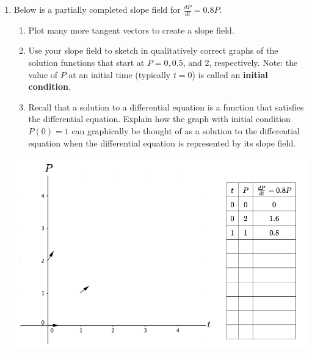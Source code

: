 \begin{enumerate}
\item Below is a partially completed slope field for  $\displaystyle \frac{dP}{dt}=0.8P$. \label{01problem7}
\begin{enumerate}
\item	Plot many more tangent vectors to create a slope field. \label{01problem7parta}
\item	Use your slope field to sketch in qualitatively correct graphs of the solution functions that start at $P = 0, 0.5$, and $2$, respectively. Note: the value of $P$ at an initial time (typically $t = 0$) is called an \textbf{initial condition}. \label{01problem7partb}
\item	Recall that a solution to a differential equation is a function that satisfies the differential equation. Explain how the graph with initial condition $P(0) = 1$ can graphically be thought of as a solution to the differential equation when the differential equation is represented by its slope field. \label{01problem7partc}
\end{enumerate}

\begin{center}
\includegraphics[width=6in]{02/02MyFirstSlopeFieldwithTable.png}
\end{center}

\clearpage


\end{enumerate}
